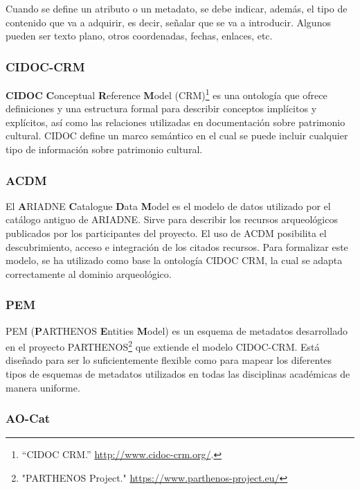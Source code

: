 \documentclass[
]{article}
\begin{document}
Cuando se define un atributo o un metadato, se debe indicar, además, el
tipo de contenido que va a adquirir, es decir, señalar que se va a
introducir. Algunos pueden ser texto plano, otros coordenadas, fechas,
enlaces, etc.

\hypertarget{cidoc-crm}{%
\subsubsection{CIDOC-CRM}\label{cidoc-crm}}

\textbf{CIDOC} \textbf{C}onceptual \textbf{R}eference \textbf{M}odel
(CRM)\footnote{``CIDOC CRM.'' \url{http://www.cidoc-crm.org/}.} es una
ontología que ofrece definiciones y una estructura formal para describir
conceptos implícitos y explícitos, así como las relaciones utilizadas en
documentación sobre patrimonio cultural. CIDOC define un marco semántico
en el cual se puede incluir cualquier tipo de información sobre
patrimonio cultural.

\hypertarget{acdm}{%
\subsubsection{ACDM}\label{acdm}}

El \textbf{A}RIADNE \textbf{C}atalogue \textbf{D}ata \textbf{M}odel es
el modelo de datos utilizado por el catálogo antiguo de ARIADNE. Sirve
para describir los recursos arqueológicos publicados por los
participantes del proyecto. El uso de ACDM posibilita el descubrimiento,
acceso e integración de los citados recursos. Para formalizar este
modelo, se ha utilizado como base la ontología CIDOC CRM, la cual se
adapta correctamente al dominio arqueológico.

\hypertarget{pem}{%
\subsubsection{PEM}\label{pem}}

PEM (\textbf{P}ARTHENOS \textbf{E}ntities \textbf{M}odel) es un esquema
de metadatos desarrollado en el proyecto PARTHENOS\footnote{"PARTHENOS
  Project." \url{https://www.parthenos-project.eu/}} que extiende el
modelo CIDOC-CRM. Está diseñado para ser lo suficientemente flexible
como para mapear los diferentes tipos de esquemas de metadatos
utilizados en todas las disciplinas académicas de manera uniforme.

\hypertarget{ao-cat}{%
\subsubsection{AO-Cat}\label{ao-cat}}
\end{document}
